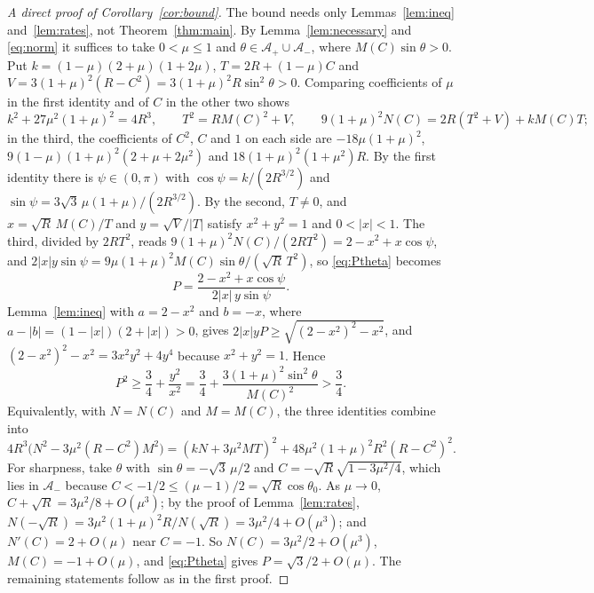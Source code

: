 \documentclass[11pt]{article}
\theoremstyle{definition}
\newcommand{\Ap}{\mathcal{A}_+}
\newcommand{\Am}{\mathcal{A}_-}
\begin{document}
\begin{proof}[A direct proof of Corollary~\ref{cor:bound}]
The bound needs only Lemmas~\ref{lem:ineq} and~\ref{lem:rates}, not Theorem~\ref{thm:main}. By Lemma~\ref{lem:necessary} and \eqref{eq:norm} it suffices to take $0 < \mu \le 1$ and $\theta \in \Ap \cup \Am$, where $M(C)\sin\theta > 0$. Put $k = (1 - \mu)(2 + \mu)(1 + 2\mu)$, $T = 2R + (1 - \mu)C$ and $V = 3(1 + \mu)^2 (R - C^2) = 3(1 + \mu)^2 R \sin^2\theta > 0$. Comparing coefficients of $\mu$ in the first identity and of $C$ in the other two shows
\[
  k^2 + 27\mu^2(1 + \mu)^2 = 4R^3, \qquad
  T^2 = R M(C)^2 + V, \qquad
  9(1 + \mu)^2 N(C) = 2R(T^2 + V) + k M(C) T;
\]
in the third, the coefficients of $C^2$, $C$ and $1$ on each side are $-18\mu(1 + \mu)^2$, $9(1 - \mu)(1 + \mu)^2(2 + \mu + 2\mu^2)$ and $18(1 + \mu)^2(1 + \mu^2)R$. By the first identity there is $\psi \in (0, \pi)$ with $\cos\psi = k/(2R^{3/2})$ and $\sin\psi = 3\sqrt{3}\,\mu(1 + \mu)/(2R^{3/2})$. By the second, $T \ne 0$, and $x = \sqrt{R}\,M(C)/T$ and $y = \sqrt{V}/|T|$ satisfy $x^2 + y^2 = 1$ and $0 < |x| < 1$. The third, divided by $2RT^2$, reads $9(1 + \mu)^2 N(C)/(2RT^2) = 2 - x^2 + x\cos\psi$, and $2|x|y\sin\psi = 9\mu(1 + \mu)^2 M(C)\sin\theta/(\sqrt{R}\,T^2)$, so \eqref{eq:Ptheta} becomes
\[
  P = \frac{2 - x^2 + x\cos\psi}{2|x|\,y\sin\psi}.
\]
Lemma~\ref{lem:ineq} with $a = 2 - x^2$ and $b = -x$, where $a - |b| = (1 - |x|)(2 + |x|) > 0$, gives $2|x|yP \ge \sqrt{(2 - x^2)^2 - x^2}$, and $(2 - x^2)^2 - x^2 = 3x^2y^2 + 4y^4$ because $x^2 + y^2 = 1$. Hence
\[
  P^2 \ge \frac34 + \frac{y^2}{x^2} = \frac34 + \frac{3(1 + \mu)^2 \sin^2\theta}{M(C)^2} > \frac34 .
\]
Equivalently, with $N = N(C)$ and $M = M(C)$, the three identities combine into
\[
  4R^3\bigl(N^2 - 3\mu^2(R - C^2)M^2\bigr) = (kN + 3\mu^2 MT)^2 + 48\mu^2(1 + \mu)^2R^2(R - C^2)^2 .
\]
For sharpness, take $\theta$ with $\sin\theta = -\sqrt{3}\,\mu/2$ and $C = -\sqrt{R}\sqrt{1 - 3\mu^2/4}$, which lies in $\Am$ because $C < -1/2 \le (\mu - 1)/2 = \sqrt{R}\cos\theta_0$. As $\mu \to 0$, $C + \sqrt{R} = 3\mu^2/8 + O(\mu^3)$; by the proof of Lemma~\ref{lem:rates}, $N(-\sqrt{R}) = 3\mu^2(1 + \mu)^2R/N(\sqrt{R}) = 3\mu^2/4 + O(\mu^3)$; and $N'(C) = 2 + O(\mu)$ near $C = -1$. So $N(C) = 3\mu^2/2 + O(\mu^3)$, $M(C) = -1 + O(\mu)$, and \eqref{eq:Ptheta} gives $P = \sqrt{3}/2 + O(\mu)$. The remaining statements follow as in the first proof.
\end{proof}
\end{document}
